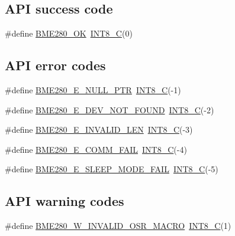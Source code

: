 \subsection*{A\+PI success code}
\begin{DoxyCompactItemize}
\item 
\#define \hyperlink{group___b_m_e280_gabfe3dd12ee6f5f5d51fbb340a22ff678}{B\+M\+E280\+\_\+\+OK}~\hyperlink{group___b_m_e280_ga1eaa7db37089dcdfb60227725c9c1585}{I\+N\+T8\+\_\+C}(0)
\end{DoxyCompactItemize}
\subsection*{A\+PI error codes}
\begin{DoxyCompactItemize}
\item 
\#define \hyperlink{group___b_m_e280_ga269f65e4816ca679d618175efefcb00d}{B\+M\+E280\+\_\+\+E\+\_\+\+N\+U\+L\+L\+\_\+\+P\+TR}~\hyperlink{group___b_m_e280_ga1eaa7db37089dcdfb60227725c9c1585}{I\+N\+T8\+\_\+C}(-\/1)
\item 
\#define \hyperlink{group___b_m_e280_ga0be1b2946c861fe3e3212e14bb9762a0}{B\+M\+E280\+\_\+\+E\+\_\+\+D\+E\+V\+\_\+\+N\+O\+T\+\_\+\+F\+O\+U\+ND}~\hyperlink{group___b_m_e280_ga1eaa7db37089dcdfb60227725c9c1585}{I\+N\+T8\+\_\+C}(-\/2)
\item 
\#define \hyperlink{group___b_m_e280_gafeb74eb5e3f125d1f03be173e40c89b0}{B\+M\+E280\+\_\+\+E\+\_\+\+I\+N\+V\+A\+L\+I\+D\+\_\+\+L\+EN}~\hyperlink{group___b_m_e280_ga1eaa7db37089dcdfb60227725c9c1585}{I\+N\+T8\+\_\+C}(-\/3)
\item 
\#define \hyperlink{group___b_m_e280_ga2b47776b53e3167b0068bc6ef21f1523}{B\+M\+E280\+\_\+\+E\+\_\+\+C\+O\+M\+M\+\_\+\+F\+A\+IL}~\hyperlink{group___b_m_e280_ga1eaa7db37089dcdfb60227725c9c1585}{I\+N\+T8\+\_\+C}(-\/4)
\item 
\#define \hyperlink{group___b_m_e280_ga2de574b1e957addef1056b59ec7502d5}{B\+M\+E280\+\_\+\+E\+\_\+\+S\+L\+E\+E\+P\+\_\+\+M\+O\+D\+E\+\_\+\+F\+A\+IL}~\hyperlink{group___b_m_e280_ga1eaa7db37089dcdfb60227725c9c1585}{I\+N\+T8\+\_\+C}(-\/5)
\end{DoxyCompactItemize}
\subsection*{A\+PI warning codes}
\begin{DoxyCompactItemize}
\item 
\#define \hyperlink{group___b_m_e280_ga14e40d625ed338734e57fbc434ca5723}{B\+M\+E280\+\_\+\+W\+\_\+\+I\+N\+V\+A\+L\+I\+D\+\_\+\+O\+S\+R\+\_\+\+M\+A\+C\+RO}~\hyperlink{group___b_m_e280_ga1eaa7db37089dcdfb60227725c9c1585}{I\+N\+T8\+\_\+C}(1)
\end{DoxyCompactItemize}
